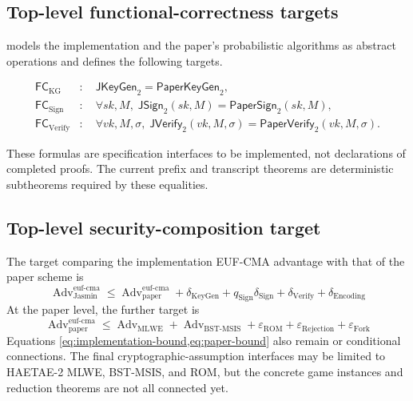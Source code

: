 \subsection{Top-level functional-correctness targets}

 models the implementation and
the paper's probabilistic algorithms as abstract operations and defines the following targets.

\begin{align*}
  \mathsf{FC}_{\mathrm{KG}}
    &:\quad \mathsf{JKeyGen}_2=\mathsf{PaperKeyGen}_2,\\
  \mathsf{FC}_{\mathrm{Sign}}
    &:\quad \forall sk,M,\;
       \mathsf{JSign}_2(sk,M)=\mathsf{PaperSign}_2(sk,M),\\
  \mathsf{FC}_{\mathrm{Verify}}
    &:\quad \forall vk,M,\sigma,\;
       \mathsf{JVerify}_2(vk,M,\sigma)
       =\mathsf{PaperVerify}_2(vk,M,\sigma).
\end{align*}

These formulas are specification interfaces to be implemented, not declarations
of completed proofs. The current prefix and transcript theorems are
deterministic subtheorems required by these equalities.

\subsection{Top-level security-composition target}

The target comparing the implementation EUF-CMA advantage with that of the paper scheme is
\begin{equation}
\label{eq:implementation-bound}
  \operatorname{Adv}^{\mathrm{euf\mbox{-}cma}}_{\mathrm{Jasmin}}
  \le
  \operatorname{Adv}^{\mathrm{euf\mbox{-}cma}}_{\mathrm{paper}}
  +\delta_{\mathrm{KeyGen}}
  +q_{\mathrm{Sign}}\delta_{\mathrm{Sign}}
  +\delta_{\mathrm{Verify}}
  +\delta_{\mathrm{Encoding}}
\end{equation}
At the paper level, the further target is
\begin{equation}
\label{eq:paper-bound}
  \operatorname{Adv}^{\mathrm{euf\mbox{-}cma}}_{\mathrm{paper}}
  \le
  \operatorname{Adv}_{\mathrm{MLWE}}
  +\operatorname{Adv}_{\mathrm{BST\mbox{-}MSIS}}
  +\varepsilon_{\mathrm{ROM}}
  +\varepsilon_{\mathrm{Rejection}}
  +\varepsilon_{\mathrm{Fork}}
\end{equation}
Equations \cref{eq:implementation-bound,eq:paper-bound} also remain
\statusspecified or conditional connections. The final cryptographic-assumption
interfaces may be limited to HAETAE-2 MLWE, BST-MSIS, and ROM, but the concrete
game instances and reduction theorems are not all connected yet.
